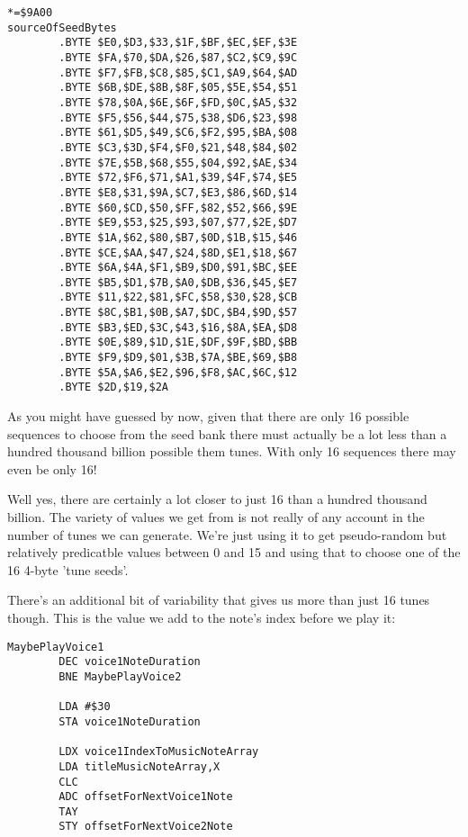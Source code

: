 \begin{lstlisting}[caption=Our seed value ultimately comes from \icode{sourceOfSeedBytes}.]
*=$9A00
sourceOfSeedBytes
        .BYTE $E0,$D3,$33,$1F,$BF,$EC,$EF,$3E
        .BYTE $FA,$70,$DA,$26,$87,$C2,$C9,$9C
        .BYTE $F7,$FB,$C8,$85,$C1,$A9,$64,$AD
        .BYTE $6B,$DE,$8B,$8F,$05,$5E,$54,$51
        .BYTE $78,$0A,$6E,$6F,$FD,$0C,$A5,$32
        .BYTE $F5,$56,$44,$75,$38,$D6,$23,$98
        .BYTE $61,$D5,$49,$C6,$F2,$95,$BA,$08
        .BYTE $C3,$3D,$F4,$F0,$21,$48,$84,$02
        .BYTE $7E,$5B,$68,$55,$04,$92,$AE,$34
        .BYTE $72,$F6,$71,$A1,$39,$4F,$74,$E5
        .BYTE $E8,$31,$9A,$C7,$E3,$86,$6D,$14
        .BYTE $60,$CD,$50,$FF,$82,$52,$66,$9E
        .BYTE $E9,$53,$25,$93,$07,$77,$2E,$D7
        .BYTE $1A,$62,$80,$B7,$0D,$1B,$15,$46
        .BYTE $CE,$AA,$47,$24,$8D,$E1,$18,$67
        .BYTE $6A,$4A,$F1,$B9,$D0,$91,$BC,$EE
        .BYTE $B5,$D1,$7B,$A0,$DB,$36,$45,$E7
        .BYTE $11,$22,$81,$FC,$58,$30,$28,$CB
        .BYTE $8C,$B1,$0B,$A7,$DC,$B4,$9D,$57
        .BYTE $B3,$ED,$3C,$43,$16,$8A,$EA,$D8
        .BYTE $0E,$89,$1D,$1E,$DF,$9F,$BD,$BB
        .BYTE $F9,$D9,$01,$3B,$7A,$BE,$69,$B8
        .BYTE $5A,$A6,$E2,$96,$F8,$AC,$6C,$12
        .BYTE $2D,$19,$2A
\end{lstlisting}

As you might have guessed by now, given that there are only 16 possible sequences to choose from the seed bank there must
actually be a lot less than a hundred thousand billion possible them tunes. With only 16 sequences there may even be
only 16!

Well yes, there are certainly a lot closer to just 16 than a hundred thousand billion. The variety of values we get
from  is not really of any account in the number of tunes we can generate. We're just using it to get pseudo-random but
relatively predicatble values between 0 and 15 and using that to choose one of the 16 4-byte 'tune seeds'.

There's an additional bit of variability that gives us more than just 16 tunes though. This is the value we add to
the note's index before we play it:

\begin{lstlisting}[caption=\icode{offsetForNextVoice1Note} introduces additional tune permutations.]
MaybePlayVoice1   
        DEC voice1NoteDuration
        BNE MaybePlayVoice2

        LDA #$30
        STA voice1NoteDuration

        LDX voice1IndexToMusicNoteArray
        LDA titleMusicNoteArray,X
        CLC
        ADC offsetForNextVoice1Note
        TAY
        STY offsetForNextVoice2Note
\end{lstlisting}

